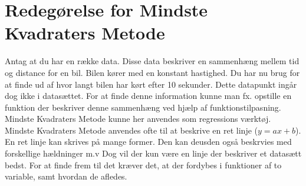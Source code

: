 \section{Redegørelse for Mindste Kvadraters Metode}\label{sec:redegorsel}
Antag at du har en række data. Disse data beskriver en sammenhæng mellem tid og distance for en bil. Bilen kører med en konstant hastighed. Du har nu brug for at finde ud af hvor langt bilen har kørt efter 10 sekunder. Dette datapunkt ingår dog ikke i datasættet. For at finde denne information kunne man fx. opstille en funktion der beskriver denne sammenhæng ved hjælp af funktionstilpasning. Mindste Kvadraters Metode kunne her anvendes som regressions værktøj. Mindste Kvadraters Metode anvendes ofte til at beskrive en ret linje (\begin{math}y = ax + b\end{math}). En ret linje kan skrives på mange former. Den kan deusden også beskrvies med forskellige hældninger m.v Dog vil der kun være en linje der beskriver et datasætt bedst. For at finde frem til det kræver det, at der fordybes i funktioner af to variable, samt hvordan de afledes.



